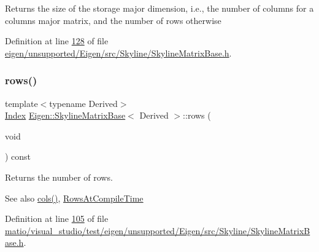 \begin{DoxyReturn}{Returns}
the size of the storage major dimension, i.\+e., the number of columns for a columns major matrix, and the number of rows otherwise 
\end{DoxyReturn}


Definition at line \hyperlink{eigen_2unsupported_2_eigen_2src_2_skyline_2_skyline_matrix_base_8h_source_l00128}{128} of file \hyperlink{eigen_2unsupported_2_eigen_2src_2_skyline_2_skyline_matrix_base_8h_source}{eigen/unsupported/\+Eigen/src/\+Skyline/\+Skyline\+Matrix\+Base.\+h}.

\mbox{\label{class_eigen_1_1_skyline_matrix_base_a8243b2fe6bcc6c3037717fcb0afa9d46}} 
\subsubsection{\texorpdfstring{rows()}{rows()}\hspace{0.1cm}{\footnotesize\ttfamily [1/2]}}
{\footnotesize\ttfamily template$<$typename Derived$>$ \\
\hyperlink{group___core___module_a554f30542cc2316add4b1ea0a492ff02}{Index} \hyperlink{class_eigen_1_1_skyline_matrix_base}{Eigen\+::\+Skyline\+Matrix\+Base}$<$ Derived $>$\+::rows (\begin{DoxyParamCaption}\item[{void}]{ }\end{DoxyParamCaption}) const\hspace{0.3cm}{\ttfamily [inline]}}

\begin{DoxyReturn}{Returns}
the number of rows. 
\end{DoxyReturn}
\begin{DoxySeeAlso}{See also}
\hyperlink{class_eigen_1_1_skyline_matrix_base_aff9cfadb45ffbae8a33b710bc9b49d71}{cols()}, \hyperlink{class_eigen_1_1_skyline_matrix_base_a811ba3961cb927ae5fa84ed278ebceeaa22b71b821112b0ccf61b7317b9ac4cf4}{Rows\+At\+Compile\+Time} 
\end{DoxySeeAlso}


Definition at line \hyperlink{matio_2visual__studio_2test_2eigen_2unsupported_2_eigen_2src_2_skyline_2_skyline_matrix_base_8h_source_l00105}{105} of file \hyperlink{matio_2visual__studio_2test_2eigen_2unsupported_2_eigen_2src_2_skyline_2_skyline_matrix_base_8h_source}{matio/visual\+\_\+studio/test/eigen/unsupported/\+Eigen/src/\+Skyline/\+Skyline\+Matrix\+Base.\+h}.

